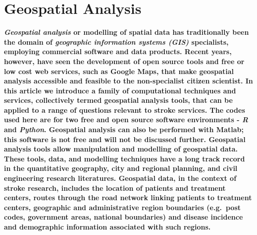 \documentclass[utf8]{frontiersHLTH}
\begin{document}

\section{Geospatial Analysis}\label{background} 
{\bf
{\em Geospatial analysis} or modelling of spatial data has
traditionally been the domain of {\em geographic information systems
  (GIS)} specialists, employing commercial software and data
products. Recent years, however, have seen the development of open
source tools and free or low cost web services, such as Google Maps,
that make geospatial analysis accessible and feasible to the
non-specialist citizen scientist. In this article we introduce a
family of computational techniques and services, collectively termed
geospatial analysis tools, that can be applied to a range of questions
relevant to stroke services. The codes used here are for two free
and open source software environments - {\em R} and  {\em Python}. Geospatial analysis
can also be performed with Matlab\cite{Milne_2017}; this software is not free and
will not be discussed further. Geospatial analysis tools allow
manipulation and modelling of geospatial data. These tools, data, and
modelling techniques have a long track record in the quantitative
geography, city and regional planning, and civil engineering research
literatures. Geospatial data, in the context of stroke research,
includes the location of patients and treatment centers, routes
through the road network linking patients to treatment centers,
geographic and administrative region boundaries (e.g.~post codes,
government areas, national boundaries) and disease incidence and
demographic information associated with such regions.
}
\end{document}
